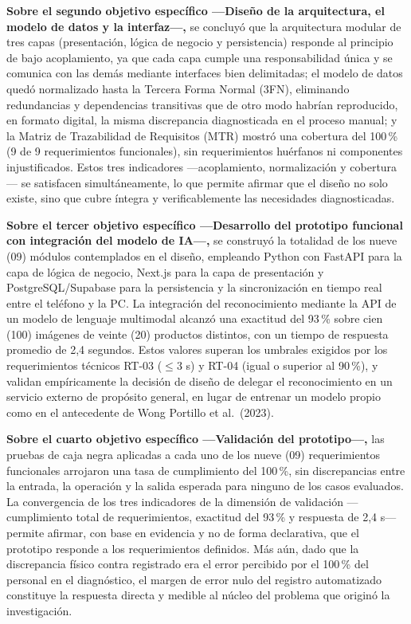 \documentclass[12pt, letterpaper]{report}
\begin{document}
\textbf{Sobre el segundo objetivo específico ---Diseño de la
arquitectura, el modelo de datos y la interfaz---,} se concluyó que la
arquitectura modular de tres capas (presentación, lógica de negocio y
persistencia) responde al principio de bajo acoplamiento, ya que cada
capa cumple una responsabilidad única y se comunica con las demás
mediante interfaces bien delimitadas; el modelo de datos quedó
normalizado hasta la Tercera Forma Normal (3FN), eliminando
redundancias y dependencias transitivas que de otro modo habrían
reproducido, en formato digital, la misma discrepancia diagnosticada
en el proceso manual; y la Matriz de Trazabilidad de Requisitos (MTR)
mostró una cobertura del 100\,\% (9 de 9 requerimientos funcionales),
sin requerimientos huérfanos ni componentes injustificados. Estos
tres indicadores ---acoplamiento, normalización y cobertura--- se
satisfacen simultáneamente, lo que permite afirmar que el diseño no
solo existe, sino que cubre íntegra y verificablemente las
necesidades diagnosticadas.

\textbf{Sobre el tercer objetivo específico ---Desarrollo del
prototipo funcional con integración del modelo de IA---,} se construyó
la totalidad de los nueve (09) módulos contemplados en el diseño,
empleando Python con FastAPI para la capa de lógica de negocio, Next.js
para la capa de presentación y PostgreSQL/Supabase para la
persistencia y la sincronización en tiempo real entre el teléfono y la
PC. La integración del reconocimiento mediante la API de un modelo de
lenguaje multimodal alcanzó una exactitud del 93\,\% sobre cien (100)
imágenes de veinte (20) productos distintos, con un tiempo de
respuesta promedio de 2,4 segundos. Estos valores superan los umbrales
exigidos por los requerimientos técnicos RT-03 ($\leq 3$ s) y RT-04
(igual o superior al 90\,\%), y validan empíricamente la decisión de diseño de
delegar el reconocimiento en un servicio externo de propósito general,
en lugar de entrenar un modelo propio como en el antecedente de Wong
Portillo et al.\ (2023).

\textbf{Sobre el cuarto objetivo específico ---Validación del
prototipo---,} las pruebas de caja negra aplicadas a cada uno de los
nueve (09) requerimientos funcionales arrojaron una tasa de
cumplimiento del 100\,\%, sin discrepancias entre la entrada, la
operación y la salida esperada para ninguno de los casos evaluados. La
convergencia de los tres indicadores de la dimensión de validación
---cumplimiento total de requerimientos, exactitud del 93\,\% y
respuesta de 2,4 s--- permite afirmar, con base en evidencia y no de
forma declarativa, que el prototipo responde a los requerimientos
definidos. Más aún, dado que la discrepancia físico contra registrado
era el error percibido por el 100\,\% del personal en el diagnóstico,
el margen de error nulo del registro automatizado constituye la
respuesta directa y medible al núcleo del problema que originó la
investigación.
\end{document}
